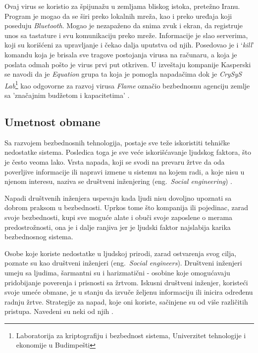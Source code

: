 \documentclass[a4paper]{article}
\begin{document}
Ovaj virus se koristio za špijunažu u zemljama bliskog istoka, pretežno Iranu. Program je mogao da se širi preko lokalnih mreža, kao i preko uređaja koji poseduju {\em Bluetooth}. Mogao je nezapaženo da snima zvuk i ekran, da registruje unos sa tastature i svu komunikaciju preko mreže. Informacije je slao serverima, koji su korišćeni za upravljanje i čekao dalja uputstva od njih. Posedovao je i ‘\textit{kill}’ komandu koja je brisala sve tragove postojanja virusa na računaru, a koja je poslata odmah pošto je virus prvi put otkriven. U izveštaju kompanije Kasperski se navodi da je \textit{Equation} grupa ta koja je pomogla napadačima dok je \textit{CrySyS Lab}\footnote{ Laboratorija za kriptografiju i bezbednost sistema, Univerzitet tehnologije i ekonomije u Budimpešti} kao odgovorne za razvoj virusa \textit{Flame} označio bezbednosnu agenciju zemlje sa 'značajnim budžetom i kapacitetima' \cite{flame}.

\subsection{Umetnost obmane}
\label{deception}

Sa razvojem bezbednosnih tehnologija, postaje sve teže iskoristiti tehničke nedostatke sistema. Posledica toga je sve veće iskorišćavanje ljudskog faktora, što je često veoma lako. Vrsta napada, koji se svodi na prevaru žrtve da oda poverljive informacije ili napravi izmene u sistemu na kojem radi, a koje nisu u njenom interesu, naziva se društveni inženjering (eng.~{\em Social engineering}) \cite{deception}.

Napadi društvenih inženjera uspevaju kada ljudi nisu dovoljno upoznati sa dobrom praksom u bezbednosti. Uprkos tome što kompanija ili pojedinac, zarad svoje bezbednosti, kupi sve moguće alate i obuči svoje zaposlene o merama predostrožnosti, ona je i dalje ranjiva jer je ljudski faktor najslabija karika bezbednosnog sistema.

Osobe koje koriste nedostatke u ljudskoj prirodi, zarad ostvarenja svog cilja, poznate su kao društveni inženjeri (eng.~{\em Social engineers}). Društveni inženjeri umeju sa ljudima, šarmantni su i harizmatični - osobine koje omogućavaju pridobijanje poverenja i prisnosti sa žrtvom. Iskusni društveni inženjer, koristeći svoje umeće obmane, je u stanju da izvuče željenu informaciju ili inicira određenu radnju žrtve. Strategije za napad, koje oni koriste, sačinjene su od više različitih pristupa. Navedeni su neki od njih \cite{deception}.
\end{document}
